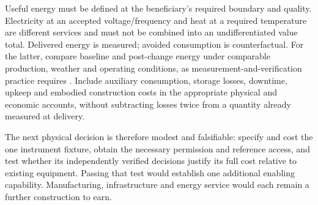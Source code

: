 Useful energy must be defined at the beneficiary's required boundary and quality. Electricity at an accepted voltage/frequency and heat at a required temperature are different services and must not be combined into an undifferentiated value total. Delivered energy is measured; avoided consumption is counterfactual. For the latter, compare baseline and post-change energy under comparable production, weather and operating conditions, as measurement-and-verification practice requires \citep{doemv}. Include auxiliary consumption, storage losses, downtime, upkeep and embodied construction costs in the appropriate physical and economic accounts, without subtracting losses twice from a quantity already measured at delivery.

The next physical decision is therefore modest and falsifiable: specify and cost the one instrument fixture, obtain the necessary permission and reference access, and test whether its independently verified decisions justify its full cost relative to existing equipment. Passing that test would establish one additional enabling capability. Manufacturing, infrastructure and energy service would each remain a further construction to earn.
